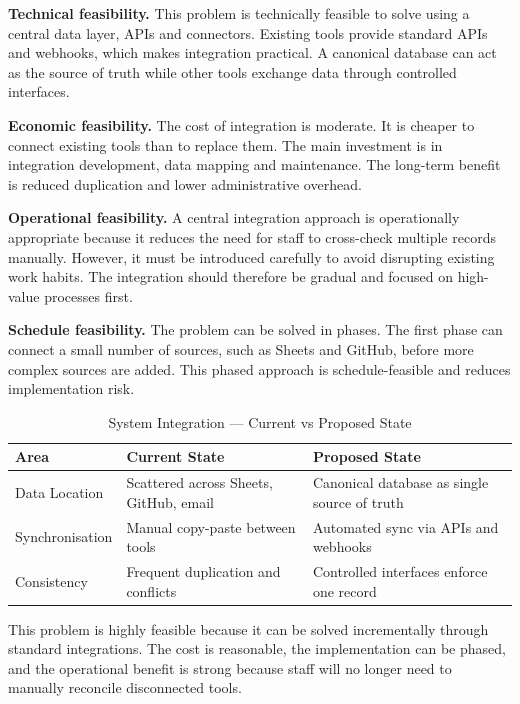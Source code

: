 \documentclass[12pt,a4paper]{report}
\begin{document}
\textbf{Technical feasibility.} This problem is technically feasible to solve using a central data layer, APIs and connectors. Existing tools provide standard APIs and webhooks, which makes integration practical. A canonical database can act as the source of truth while other tools exchange data through controlled interfaces.

\textbf{Economic feasibility.} The cost of integration is moderate. It is cheaper to connect existing tools than to replace them. The main investment is in integration development, data mapping and maintenance. The long-term benefit is reduced duplication and lower administrative overhead.

\textbf{Operational feasibility.} A central integration approach is operationally appropriate because it reduces the need for staff to cross-check multiple records manually. However, it must be introduced carefully to avoid disrupting existing work habits. The integration should therefore be gradual and focused on high-value processes first.

\textbf{Schedule feasibility.} The problem can be solved in phases. The first phase can connect a small number of sources, such as Sheets and GitHub, before more complex sources are added. This phased approach is schedule-feasible and reduces implementation risk.

\begin{table}[H]
\centering
\renewcommand{\arraystretch}{1.3}
\begin{tabularx}{\textwidth}{|p{4cm}|X|X|}
\hline
\rowcolor{secondary}
\textbf{Area} & \textbf{Current State} & \textbf{Proposed State} \\
\hline
Data Location & Scattered across Sheets, GitHub, email & Canonical database as single source of truth \\
\hline
Synchronisation & Manual copy-paste between tools & Automated sync via APIs and webhooks \\
\hline
Consistency & Frequent duplication and conflicts & Controlled interfaces enforce one record \\
\hline
\end{tabularx}
\caption{System Integration --- Current vs Proposed State}
\end{table}

\begin{summaryBox}
This problem is highly feasible because it can be solved incrementally through standard integrations. The cost is reasonable, the implementation can be phased, and the operational benefit is strong because staff will no longer need to manually reconcile disconnected tools.
\end{summaryBox}
\end{document}
